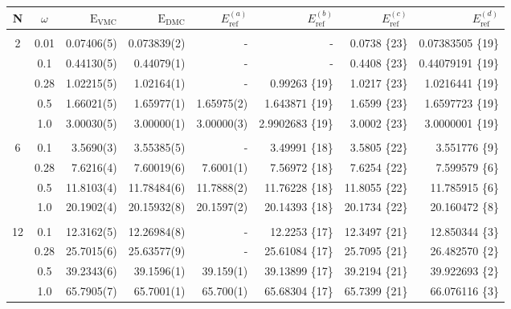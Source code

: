 \setlength{\tabcolsep}{5pt}
\begin{table}
\begin{center}
\begin{tabular}{cc|rrrrrr}
    N     & $\omega$ & $\mathrm{E_{VMC}}$ & $\mathrm{E_{DMC}}$ & $E_\mathrm{ref}^{(a)}$& $E_\mathrm{ref}^{(b)}$ & $E_\mathrm{ref}^{(c)}$ & $E_\mathrm{ref}^{(d)}$\\
\hline\hline
\multicolumn{8}{c}{} \\
    2     &   0.01   & 0.07406(5)  & 0.073839(2)  & -		& -			& 0.0738 \{23\} & 0.07383505 \{19\}\\
          &   0.1    & 0.44130(5)  & 0.44079(1)   & - 		& - 			& 0.4408 \{23\} & 0.44079191 \{19\}\\
          &   0.28   & 1.02215(5)  & 1.02164(1)   & -		&0.99263 \{19\} 	& 1.0217 \{23\}  & 1.0216441 \{19\}\\
          &   0.5    & 1.66021(5)  & 1.65977(1)   & 1.65975(2)&1.643871 \{19\}	& 1.6599 \{23\}  & 1.6597723 \{19\}\\
          &   1.0    & 3.00030(5)  & 3.00000(1)   & 3.00000(3)&2.9902683 \{19\}	& 3.0002 \{23\}  & 3.0000001 \{19\}\\
\cline{2-8}
\multicolumn{8}{c}{} \\
    6     &   0.1    &  3.5690(3)  &  3.55385(5)  & -		&3.49991 \{18\} 	& 3.5805 \{22\}  & 3.551776 \{9\}\\
          &   0.28   &  7.6216(4)  &  7.60019(6)  & 7.6001(1) &7.56972 \{18\} 	& 7.6254 \{22\}  & 7.599579 \{6\}\\
          &   0.5    & 11.8103(4)  & 11.78484(6)  & 11.7888(2)&11.76228 \{18\}	& 11.8055 \{22\} & 11.785915 \{6\}\\
          &   1.0    & 20.1902(4)  & 20.15932(8)  & 20.1597(2)&20.14393 \{18\}	& 20.1734 \{22\} & 20.160472 \{8\}\\
\cline{2-8}
\multicolumn{8}{c}{} \\
    12    &   0.1    & 12.3162(5)  & 12.26984(8)  & - 		&12.2253 \{17\} 	& 12.3497 \{21\} & 12.850344 \{3\}\\
          &   0.28   & 25.7015(6)  & 25.63577(9)  & - 		&25.61084 \{17\} 	& 25.7095 \{21\} & 26.482570 \{2\}\\
          &   0.5    & 39.2343(6)  & 39.1596(1)   & 39.159(1) &39.13899 \{17\}	& 39.2194 \{21\} & 39.922693 \{2\}\\
          &   1.0    & 65.7905(7)  & 65.7001(1)   & 65.700(1) &65.68304 \{17\}	& 65.7399 \{21\} & 66.076116 \{3\}\\

\end{tabular}
\end{center}
\end{table}
